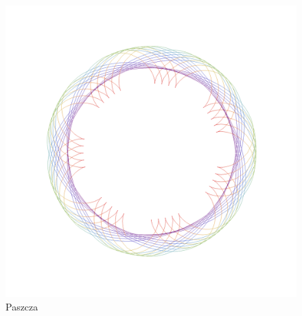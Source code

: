 %
\begin{figure}[tp]
  \centering
  \includegraphics[scale=0.5]{figures/chapter_06/mal7b.pdf}
  \caption{Paszcza}
\end{figure}
%
